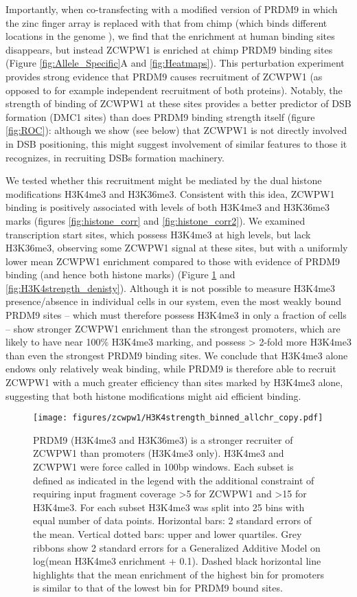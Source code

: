 Importantly, when co-transfecting with a modified version of PRDM9 in which the zinc finger array is replaced with that from chimp (which binds different locations in the genome \parencite{Altemose2017map}), we find that the enrichment at human binding sites disappears, but instead ZCWPW1 is enriched at chimp PRDM9 binding sites (Figure \ref{fig:Allele_Specific}A and \ref{fig:Heatmaps}).
This perturbation experiment provides strong evidence that PRDM9 causes recruitment of ZCWPW1 (as opposed to for example independent recruitment of both proteins).
Notably, the strength of binding of ZCWPW1 at these sites provides a better predictor of DSB formation (DMC1 sites) than does PRDM9 binding strength itself (figure \ref{fig:ROC}): although we show (see below) that ZCWPW1 is not directly involved in DSB positioning, this might suggest involvement of similar features to those it recognizes, in recruiting DSBs formation machinery.

We tested whether this recruitment might be mediated by the dual histone modifications H3K4me3 and H3K36me3.
Consistent with this idea, ZCWPW1 binding is positively associated with levels of both H3K4me3 and H3K36me3 marks (figures \ref{fig:histone_corr} and \ref{fig:histone_corr2}).
We examined transcription start sites, which possess H3K4me3 at high levels, but lack H3K36me3, observing some ZCWPW1 signal at these sites, but with a uniformly lower mean ZCWPW1 enrichment compared to those with evidence of PRDM9 binding (and hence both histone marks) (Figure \ref{fig:DualMark} and \ref{fig:H3K4strength_denisty}).
Although it is not possible to measure H3K4me3 presence/absence in individual cells in our system, even the most weakly bound PRDM9 sites – which must therefore possess H3K4me3 in only a fraction of cells – show stronger ZCWPW1 enrichment than the strongest promoters, which are likely to have near 100\% H3K4me3 marking, and possess > 2-fold more H3K4me3 than even the strongest PRDM9 binding sites.
We conclude that H3K4me3 alone endows only relatively weak binding, while PRDM9 is therefore able to recruit ZCWPW1 with a much greater efficiency than sites marked by H3K4me3 alone, suggesting that both histone modifications might aid efficient binding.


\begin{figure}[H]
	\centering
	\texttt{[image: figures/zcwpw1/H3K4strength\_binned\_allchr\_copy.pdf]}
	\caption[Dual mark recruitment]{
		PRDM9 (H3K4me3 and H3K36me3) is a stronger recruiter of ZCWPW1 than promoters (H3K4me3 only).
		H3K4me3 and ZCWPW1 were force called in 100bp windows.
		Each subset is defined as indicated in the legend with the additional constraint of requiring input fragment coverage >5 for ZCWPW1 and >15 for H3K4me3.
		For each subset H3K4me3 was split into 25 bins with equal number of data points.
		Horizontal bars: 2 standard errors of the mean.
		Vertical dotted bars: upper and lower quartiles.
		Grey ribbons show 2 standard errors for a Generalized Additive Model on log(mean H3K4me3 enrichment + 0.1).
		Dashed black horizontal line highlights that the mean enrichment of the highest bin for promoters is similar to that of the lowest bin for PRDM9 bound sites.
	}
	\label{fig:DualMark}
\end{figure}

